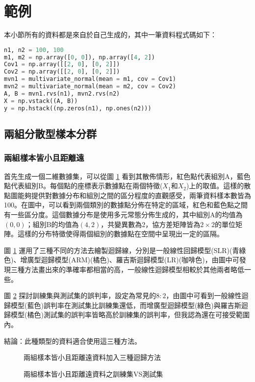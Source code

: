 \documentclass[12pt, a4paper]{article}
\begin{document}
\section{範例}
本小節所有的資料都是來自於自己生成的，其中一筆資料程式碼如下：
\begin{lstlisting}[language=Python]
n1, n2 = 100, 100
m1, m2 = np.array([0, 0]), np.array([4, 2])
Cov1 = np.array([[2, 0], [0, 2]])
Cov2 = np.array([[2, 0], [0, 2]])
mvn1 = multivariate_normal(mean = m1, cov = Cov1)
mvn2 = multivariate_normal(mean = m2, cov = Cov2)
A, B = mvn1.rvs(n1), mvn2.rvs(n2)
X = np.vstack((A, B))
y = np.hstack((np.zeros(n1), np.ones(n2)))
\end{lstlisting}
\subsection{兩組分散型樣本分群}
\subsubsection{兩組樣本皆小且距離遠}
首先生成一個二維數據集，可以從圖 \ref{fig:rdn1-LARline} 看到其散佈情形，紅色點代表組別A，藍色點代表組別B。每個點的座標表示數據點在兩個特徵($X_1$和$X_2$)上的取值。這樣的散點圖能夠提供對數據分布和組別之間的區分程度的直觀感受，兩筆資料樣本數皆為100。在圖中，可以看到兩個類別的數據點分佈在特定的區域，紅色和藍色點之間有一些區分度。這個數據分布是使用多元常態分佈生成的，其中組別A的均值為$(0, 0)$；組別B的均值為$(4, 2)$，共變異數為2，協方差矩陣皆為$2 \times 2$的單位矩陣。這樣的分布特徵使得兩個組別的數據點在空間中呈現出一定的區隔。

圖 \ref{fig:rdn1-LARline} 運用了三種不同的方法去繪製迴歸線，分別是一般線性回歸模型(SLR)(青綠色)、增廣型迴歸模型(ARM)(橘色)、羅吉斯迴歸模型(LR)(咖啡色)，由圖中可發現三種方法畫出來的準確率都相當的高，一般線性迴歸模型相較於其他兩者略低一些。

圖 \ref{fig:rdn1-LARline2} 探討訓練集與測試集的誤判率，設定為常見的$8:2$，由圖中可看到一般線性迴歸模型(藍色)誤判率在測試集比訓練集還低，而增廣型迴歸模型(綠色)與羅吉斯迴歸模型(橘色)測試集的誤判率皆略高於訓練集的誤判率，但我認為還在可接受範圍內。

結論：此種類型的資料適合使用這三種方法。
\begin{figure}[H]
    \caption{兩組樣本皆小且距離遠資料加入三種迴歸方法}
    \label{fig:rdn1-LARline}
\end{figure}


\begin{figure}[H]
    \caption{兩組樣本皆小且距離遠資料之訓練集VS測試集}
    \label{fig:rdn1-LARline2}
\end{figure}
\end{document}
